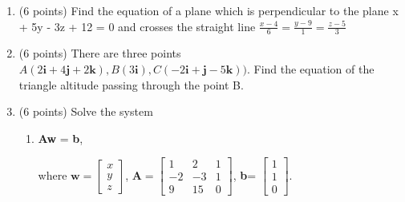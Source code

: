 \documentclass[]{exam}
\begin{document}
\begin{enumerate}

\item (6 points) 
Find the equation of a plane which is perpendicular to the plane x + 5y - 3z + 12 = 0 and crosses the straight line $\frac{x-4}{6} = \frac{y-9}{1} = \frac{z-5}{3}$ 





\item (6 points)  
There are three points $A(2\textbf{i} + 4\textbf{j} + 2\textbf{k}), B(3\textbf{i}), C(-2\textbf{i} + \textbf{j} - 5\textbf{k}))$. Find the equation of the triangle altitude passing through the point B.





\item (6 points) Solve the system 
\begin{enumerate}
    \item \textbf{Aw} = \textbf{b}, 
    
    where 
    $\textbf{w} =\begin{bmatrix}
    x \\ y \\ z
    \end{bmatrix}$,
    $\textbf{A}=\begin{bmatrix}
1 & 2 & 1 \\
-2 & -3 & 1 \\
9 & 15 & 0
\end{bmatrix}$, 
\textbf{b}=
$
\begin{bmatrix}
1 \\
1 \\
0
\end{bmatrix}$.
    
\begin{enumerate}
 

\end{enumerate}
\end{enumerate}
\end{enumerate}
\end{document}
